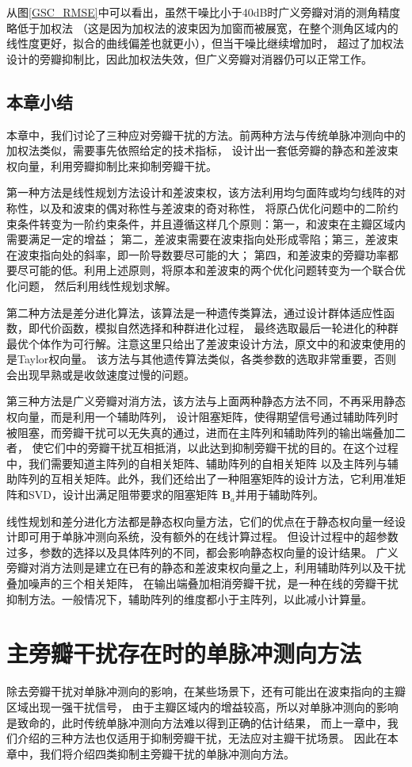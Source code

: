\documentclass[master]{thesis-uestc}
\begin{document}
从图\ref{GSC_RMSE}中可以看出，虽然干噪比小于40dB时广义旁瓣对消的测角精度略低于加权法
（这是因为加权法的波束因为加窗而被展宽，在整个测角区域内的线性度更好，拟合的曲线偏差也就更小），但当干噪比继续增加时，
超过了加权法设计的旁瓣抑制比，因此加权法失效，但广义旁瓣对消器仍可以正常工作。

\section{本章小结}
本章中，我们讨论了三种应对旁瓣干扰的方法。前两种方法与传统单脉冲测向中的加权法类似，需要事先依照给定的技术指标，
设计出一套低旁瓣的静态和差波束权向量，利用旁瓣抑制比来抑制旁瓣干扰。

第一种方法是线性规划方法设计和差波束权，该方法利用均匀面阵或均匀线阵的对称性，以及和波束的偶对称性与差波束的奇对称性，
将原凸优化问题中的二阶约束条件转变为一阶约束条件，并且遵循这样几个原则：第一，和波束在主瓣区域内需要满足一定的增益；
第二，差波束需要在波束指向处形成零陷；第三，差波束在波束指向处的斜率，即一阶导数要尽可能的大；
第四，和差波束的旁瓣功率都要尽可能的低。利用上述原则，将原本和差波束的两个优化问题转变为一个联合优化问题，
然后利用线性规划求解。

第二种方法是差分进化算法，该算法是一种遗传类算法，通过设计群体适应性函数，即代价函数，模拟自然选择和种群进化过程，
最终选取最后一轮进化的种群最优个体作为可行解。注意这里只给出了差波束设计方法，原文中的和波束使用的是Taylor权向量。
该方法与其他遗传算法类似，各类参数的选取非常重要，否则会出现早熟或是收敛速度过慢的问题。

第三种方法是广义旁瓣对消方法，该方法与上面两种静态方法不同，不再采用静态权向量，而是利用一个辅助阵列，
设计阻塞矩阵，使得期望信号通过辅助阵列时被阻塞，而旁瓣干扰可以无失真的通过，进而在主阵列和辅助阵列的输出端叠加二者，
使它们中的旁瓣干扰互相抵消，以此达到抑制旁瓣干扰的目的。在这个过程中，我们需要知道主阵列的自相关矩阵、辅助阵列的自相关矩阵
以及主阵列与辅助阵列的互相关矩阵。此外，我们还给出了一种阻塞矩阵的设计方法，它利用准矩阵和SVD，设计出满足阻带要求的阻塞矩阵
$\bm{B}_a$并用于辅助阵列。

线性规划和差分进化方法都是静态权向量方法，它们的优点在于静态权向量一经设计即可用于单脉冲测向系统，没有额外的在线计算过程。
但设计过程中的超参数过多，参数的选择以及具体阵列的不同，都会影响静态权向量的设计结果。
广义旁瓣对消方法则是建立在已有的静态和差波束权向量之上，利用辅助阵列以及干扰叠加噪声的三个相关矩阵，
在输出端叠加相消旁瓣干扰，是一种在线的旁瓣干扰抑制方法。一般情况下，辅助阵列的维度都小于主阵列，以此减小计算量。

\chapter{主旁瓣干扰存在时的单脉冲测向方法}
除去旁瓣干扰对单脉冲测向的影响，在某些场景下，还有可能出在波束指向的主瓣区域出现一强干扰信号，
由于主瓣区域内的增益较高，所以对单脉冲测向的影响是致命的，此时传统单脉冲测向方法难以得到正确的估计结果，
而上一章中，我们介绍的三种方法也仅适用于抑制旁瓣干扰，无法应对主瓣干扰场景。
因此在本章中，我们将介绍四类抑制主旁瓣干扰的单脉冲测向方法。
\end{document}
